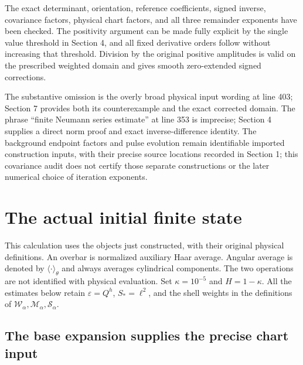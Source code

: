 \documentclass[10pt,a4paper]{article}
\begin{document}
The exact determinant, orientation, reference coefficients, signed inverse, covariance factors, physical chart factors, and all three remainder exponents have been checked. The positivity argument can be made fully explicit by the single value threshold in Section 4, and all fixed derivative orders follow without increasing that threshold. Division by the original positive amplitudes is valid on the prescribed weighted domain and gives smooth zero-extended signed corrections.

The substantive omission is the overly broad physical input wording at line 403; Section 7 provides both its counterexample and the exact corrected domain. The phrase ``finite Neumann series estimate'' at line 353 is imprecise; Section 4 supplies a direct norm proof and exact inverse-difference identity. The background endpoint factors and pulse evolution remain identifiable imported construction inputs, with their precise source locations recorded in Section 1; this covariance audit does not certify those separate constructions or the later numerical choice of iteration exponents.



\section{The actual initial finite state}

This calculation uses the objects just constructed, with their original physical
definitions.  An overbar is normalized auxiliary Haar average.  Angular average
is denoted by $\langle\cdot\rangle_\theta$ and always averages cylindrical
components.  The two operations are not identified with physical evaluation.
Set $\kappa=10^{-5}$ and $H=1-\kappa$.  All the estimates below retain
$\varepsilon=Q^h$, $S_*=\ell^2$, and the shell weights in the definitions of
$\mathcal W_\alpha,\mathcal M_\alpha,\mathcal S_\alpha$.

\subsection{The base expansion supplies the precise chart input}
\end{document}
